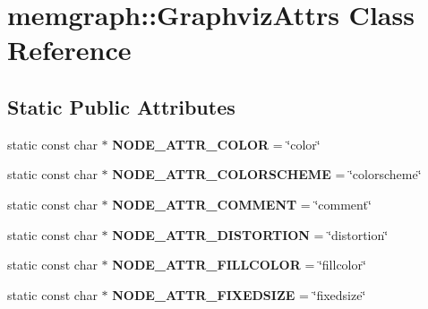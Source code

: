 \hypertarget{classmemgraph_1_1_graphviz_attrs}{}\section{memgraph\+:\+:Graphviz\+Attrs Class Reference}
\label{classmemgraph_1_1_graphviz_attrs}
\subsection*{Static Public Attributes}
\begin{DoxyCompactItemize}
\item 
static const char $\ast$ {\bfseries N\+O\+D\+E\+\_\+\+A\+T\+T\+R\+\_\+\+C\+O\+L\+OR} = \char`\"{}color\char`\"{}\hypertarget{classmemgraph_1_1_graphviz_attrs_a806c6270545f1b521729c5b540c4122f}{}\label{classmemgraph_1_1_graphviz_attrs_a806c6270545f1b521729c5b540c4122f}

\item 
static const char $\ast$ {\bfseries N\+O\+D\+E\+\_\+\+A\+T\+T\+R\+\_\+\+C\+O\+L\+O\+R\+S\+C\+H\+E\+ME} = \char`\"{}colorscheme\char`\"{}\hypertarget{classmemgraph_1_1_graphviz_attrs_ac4eb5d441fbee5b0b23375ec2defdd12}{}\label{classmemgraph_1_1_graphviz_attrs_ac4eb5d441fbee5b0b23375ec2defdd12}

\item 
static const char $\ast$ {\bfseries N\+O\+D\+E\+\_\+\+A\+T\+T\+R\+\_\+\+C\+O\+M\+M\+E\+NT} = \char`\"{}comment\char`\"{}\hypertarget{classmemgraph_1_1_graphviz_attrs_abf7eb10b64903320c274da5e28068729}{}\label{classmemgraph_1_1_graphviz_attrs_abf7eb10b64903320c274da5e28068729}

\item 
static const char $\ast$ {\bfseries N\+O\+D\+E\+\_\+\+A\+T\+T\+R\+\_\+\+D\+I\+S\+T\+O\+R\+T\+I\+ON} = \char`\"{}distortion\char`\"{}\hypertarget{classmemgraph_1_1_graphviz_attrs_aedf0983de98898cd0294a8b6941959bf}{}\label{classmemgraph_1_1_graphviz_attrs_aedf0983de98898cd0294a8b6941959bf}

\item 
static const char $\ast$ {\bfseries N\+O\+D\+E\+\_\+\+A\+T\+T\+R\+\_\+\+F\+I\+L\+L\+C\+O\+L\+OR} = \char`\"{}fillcolor\char`\"{}\hypertarget{classmemgraph_1_1_graphviz_attrs_ae1ccfda08259bfb6e0405d9dc2fa831b}{}\label{classmemgraph_1_1_graphviz_attrs_ae1ccfda08259bfb6e0405d9dc2fa831b}

\item 
static const char $\ast$ {\bfseries N\+O\+D\+E\+\_\+\+A\+T\+T\+R\+\_\+\+F\+I\+X\+E\+D\+S\+I\+ZE} = \char`\"{}fixedsize\char`\"{}\hypertarget{classmemgraph_1_1_graphviz_attrs_a5b2e00e1315c58be077045d155de68c8}{}\label{classmemgraph_1_1_graphviz_attrs_a5b2e00e1315c58be077045d155de68c8}


\end{DoxyCompactItemize}
